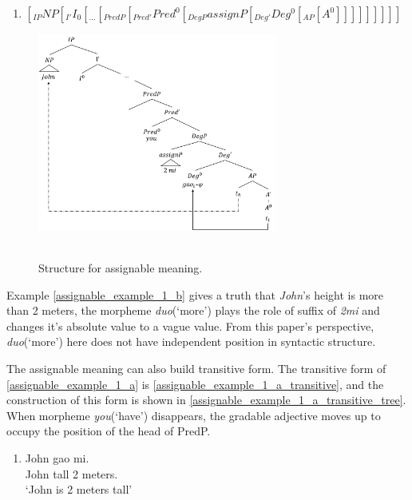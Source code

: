 \documentclass{ctexart}
\begin{document}
\begin{enumerate}
    \item \label{assignable_structure}
    $[_{IP} NP [_{I'} I_0[_{...}[_{PredP}[_{Pred'}Pred^0[_{DegP}assignP[_{Deg'}Deg^0[_{AP}[A^0]]]]]]]]]$
\end{enumerate}

\begin{figure}[H]
    \centering
    \includegraphics[width=0.7\textwidth]{pic/assignment_meaning.png}
    \begin{caption}
        \\ \vspace{-1.1ex}
        Structure for assignable meaning.
    \end{caption}
\end{figure}

Example \ref{assignable_example_1_b} gives a truth that \textit{John}'s height is more than 2 meters, the morpheme \textit{duo}(`more') plays the role of suffix of \textit{2mi} and changes it's absolute value to a vague value. From this paper's perspective, \textit{duo}(`more') here does not have independent position in syntactic structure.

The assignable meaning can also build transitive form. The transitive form of \ref{assignable_example_1_a} is \ref{assignable_example_1_a_transitive}, and the construction of this form is shown in \ref{assignable_example_1_a_transitive_tree}. When morpheme \textit{you}(`have') disappears, the gradable adjective moves up to occupy the position of the head of PredP.

\begin{enumerate}
    \item \label{assignable_example_1_a_transitive}
    John gao  mi. \\
    John tall 2 meters. \\
    `John is 2 meters tall'
\end{enumerate}
\end{document}
